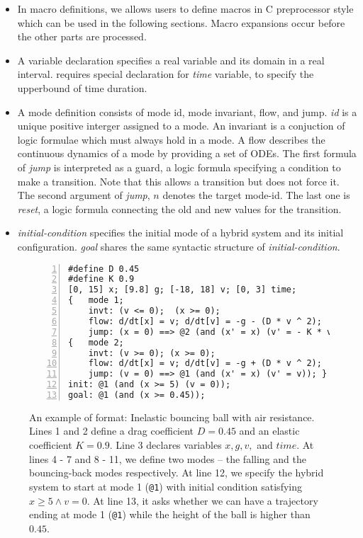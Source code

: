 \begin{itemize}
\item In macro definitions, we allows users to define macros in C
preprocessor style which can be used in the following
sections. Macro expansions occur before the other parts are processed.

\item A variable declaration specifies a real variable and its domain
  in a real interval. \dReach{} requires special declaration for
  \textit{time} variable, to specify the upperbound of time duration.

\item A mode definition consists of mode id, mode invariant, flow, and jump.
\textit{id} is a unique positive interger assigned to a mode. An
invariant is a conjuction of logic formulae which must always hold in
a mode. A flow describes the continuous dynamics of a mode by providing
a set of ODEs. The first
formula of \textit{jump} is interpreted as a guard, a logic formula
specifying a condition to make a transition. Note that this allows a
transition but does not force it. The second argument of
\textit{jump}, $n$ denotes the target mode-id. The last one is
\textit{reset}, a logic formula connecting the old and new values for
the transition.

\item \textit{initial-condition} specifies the initial mode of a hybrid
system and its initial configuration. \textit{goal} shares the same
syntactic structure of \textit{initial-condition}.
\end{itemize}
\begin{figure}
  \centering
  \begin{Verbatim}[fontfamily=courier, frame=single, framesep=1mm,
  numbers=left, fontsize=\scriptsize]
#define D 0.45
#define K 0.9
[0, 15] x; [9.8] g; [-18, 18] v; [0, 3] time;
{   mode 1;
    invt: (v <= 0);  (x >= 0);
    flow: d/dt[x] = v; d/dt[v] = -g - (D * v ^ 2);
    jump: (x = 0) ==> @2 (and (x' = x) (v' = - K * v)); }
{   mode 2;
    invt: (v >= 0); (x >= 0);
    flow: d/dt[x] = v; d/dt[v] = -g + (D * v ^ 2);
    jump: (v = 0) ==> @1 (and (x' = x) (v' = v)); }
init: @1 (and (x >= 5) (v = 0));
goal: @1 (and (x >= 0.45));
\end{Verbatim}
\caption{An example of \drh{} format: Inelastic bouncing ball with air
  resistance. Lines 1 and 2 define a drag coefficient $D = 0.45$ and
  an elastic coefficient $K = 0.9$. Line 3 declares variables
  $x, g, v,$ and $time$. At lines 4 - 7 and 8 - 11, we define two
  modes -- the falling and the bouncing-back modes respectively. At
  line 12, we specify the hybrid system to start at mode 1
  (\texttt{@1}) with initial condition satisfying
  $x \ge 5 \land v = 0$. At line 13, it asks whether we can have
  a trajectory ending at mode 1 (\texttt{@1}) while the height of the
  ball is higher than $0.45$.}
\label{fig:bouncing-ball-drh}
\end{figure}
\vspace{-2.6em}
